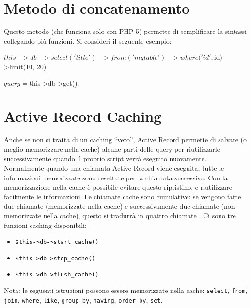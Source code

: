 \section*{Metodo di concatenamento}
Questo metodo (che funziona solo con PHP 5) permette di semplificare la sintassi collegando più funzioni. Si consideri il seguente esempio:

\begin{code}
$this->db->select('title')->from('mytable')->where('id', $id)->limit(10, 20);

$query = $this->db->get();
\end{code}

\section*{Active Record Caching}
Anche se non si tratta di un caching ``vero'', Active Record permette di salvare (o meglio memorizzare nella cache) alcune parti delle query per riutilizzarle successivamente quando il proprio script verrà eseguito nuovamente. Normalmente quando una chiamata Active Record viene eseguita, tutte le informazioni memorizzate sono resettate per la chiamata successiva. Con la memorizzazione nella cache è possibile evitare questo ripristino, e riutilizzare facilmente le informazioni. Le chiamate cache sono cumulative: se vengono fatte due chiamate  (memorizzate nella cache) e successivamente due chiamate  (non memorizzate nella cache), questo si tradurrà in quattro chiamate . Ci sono tre funzioni caching disponibili:

\begin{itemize}
\item \verb|$this->db->start_cache()|

\item \verb|$this->db->stop_cache()|

\item \verb|$this->db->flush_cache()|
\end{itemize}


Nota: le seguenti istruzioni possono essere memorizzate nella cache: \verb|select|, \verb|from|, \verb|join|, \verb|where|, \verb|like|, \verb|group_by|, \verb|having|, \verb|order_by|, \verb|set|.